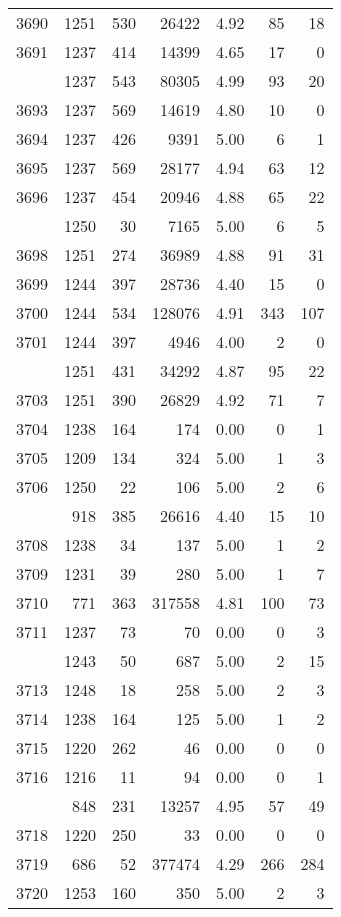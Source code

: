 \documentclass[
]{article}
\begin{document}
\begin{table}
\begin{tabular}[t]{lrrrrrr}
3690 & 1251 & 530 & 26422 & 4.92 & 85 & 18\\
3691 & 1237 & 414 & 14399 & 4.65 & 17 & 0\\
\addlinespace
3692 & 1237 & 543 & 80305 & 4.99 & 93 & 20\\
3693 & 1237 & 569 & 14619 & 4.80 & 10 & 0\\
3694 & 1237 & 426 & 9391 & 5.00 & 6 & 1\\
3695 & 1237 & 569 & 28177 & 4.94 & 63 & 12\\
3696 & 1237 & 454 & 20946 & 4.88 & 65 & 22\\
\addlinespace
3697 & 1250 & 30 & 7165 & 5.00 & 6 & 5\\
3698 & 1251 & 274 & 36989 & 4.88 & 91 & 31\\
3699 & 1244 & 397 & 28736 & 4.40 & 15 & 0\\
3700 & 1244 & 534 & 128076 & 4.91 & 343 & 107\\
3701 & 1244 & 397 & 4946 & 4.00 & 2 & 0\\
\addlinespace
3702 & 1251 & 431 & 34292 & 4.87 & 95 & 22\\
3703 & 1251 & 390 & 26829 & 4.92 & 71 & 7\\
3704 & 1238 & 164 & 174 & 0.00 & 0 & 1\\
3705 & 1209 & 134 & 324 & 5.00 & 1 & 3\\
3706 & 1250 & 22 & 106 & 5.00 & 2 & 6\\
\addlinespace
3707 & 918 & 385 & 26616 & 4.40 & 15 & 10\\
3708 & 1238 & 34 & 137 & 5.00 & 1 & 2\\
3709 & 1231 & 39 & 280 & 5.00 & 1 & 7\\
3710 & 771 & 363 & 317558 & 4.81 & 100 & 73\\
3711 & 1237 & 73 & 70 & 0.00 & 0 & 3\\
\addlinespace
3712 & 1243 & 50 & 687 & 5.00 & 2 & 15\\
3713 & 1248 & 18 & 258 & 5.00 & 2 & 3\\
3714 & 1238 & 164 & 125 & 5.00 & 1 & 2\\
3715 & 1220 & 262 & 46 & 0.00 & 0 & 0\\
3716 & 1216 & 11 & 94 & 0.00 & 0 & 1\\
\addlinespace
3717 & 848 & 231 & 13257 & 4.95 & 57 & 49\\
3718 & 1220 & 250 & 33 & 0.00 & 0 & 0\\
3719 & 686 & 52 & 377474 & 4.29 & 266 & 284\\
3720 & 1253 & 160 & 350 & 5.00 & 2 & 3\\

\end{tabular}
\end{table}
\end{document}
